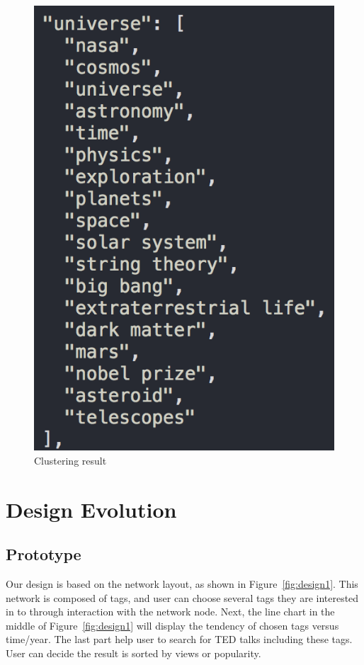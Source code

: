 \documentclass{report}
\numberwithin{figure}{section}
\begin{document}
\begin{figure} [h]
\begin{center}
\includegraphics[scale=0.5]{universegroup}
\caption{Clustering result}
\label{fig:group}
\end{center}
\end{figure}

\chapter{Design Evolution}

\section{Prototype}
\quad Our design is based on the network layout, as shown in Figure~\ref{fig:design1}. This network is composed of tags, and user can choose several tags they are interested in to through interaction with the network node. Next, the line chart in the middle of Figure~\ref{fig:design1} will display the tendency of chosen tags versus time/year. The last part help user to search for TED talks including these tags. User can decide the result is sorted by views or popularity.
\end{document}
